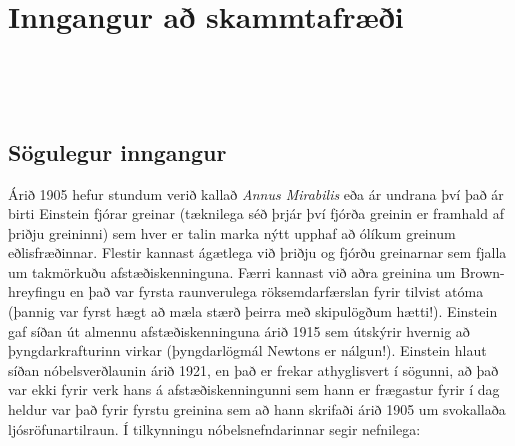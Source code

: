 \ifdefined \wholebook \else\documentclass[oneside]{book}\usepackage{EdlBook}\graphicspath{{figures/}}
\begin{document}
%
\setcounter{chapter}{24} %
%
\fi

\renewcommand{\thefigure}{\arabic{figure}}


\chapter{Inngangur að skammtafræði}



\begin{tcolorbox}

 \\

\vspace{-0.5cm}
\end{tcolorbox}

\begin{tcolorbox}

 \\

\vspace{-0.5cm}
\end{tcolorbox}

\section{Sögulegur inngangur}

Árið 1905 hefur stundum verið kallað \textit{Annus Mirabilis} eða ár undrana því það ár birti Einstein fjórar greinar (tæknilega séð þrjár því fjórða greinin er framhald af þriðju greininni) sem hver er talin marka nýtt upphaf að ólíkum greinum eðlisfræðinnar. Flestir kannast ágætlega við þriðju og fjórðu greinarnar sem fjalla um takmörkuðu afstæðiskenninguna. Færri kannast við aðra greinina um Brown-hreyfingu en það var fyrsta raunverulega röksemdarfærslan fyrir tilvist atóma (þannig var fyrst hægt að mæla stærð þeirra með skipulögðum hætti!). Einstein gaf síðan út almennu afstæðiskenninguna árið 1915 sem útskýrir hvernig að þyngdarkrafturinn virkar (þyngdarlögmál Newtons er nálgun!). Einstein hlaut síðan nóbelsverðlaunin árið 1921, en það er frekar athyglisvert í sögunni, að það var ekki fyrir verk hans á afstæðiskenningunni sem hann er frægastur fyrir í dag heldur var það fyrir fyrstu greinina sem að hann skrifaði árið 1905 um svokallaða ljósröfunartilraun. Í tilkynningu nóbelsnefndarinnar segir nefnilega: \\
\end{document}
